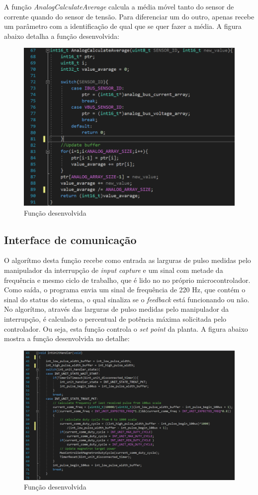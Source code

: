 A função \textit{AnalogCalculateAverage} calcula a média móvel tanto do sensor de corrente quando do sensor de tensão. Para diferenciar um do outro, apenas recebe um parâmetro com a identificação de qual que se quer fazer a média. A figura abaixo detalha a função desenvolvida:

\begin{figure}[H]
    \centering
    \includegraphics[width=1\textwidth]{./dados/figuras/func_average}
    \caption{Função desenvolvida}
    \label{fig:figura-magnetron-usado}
\end{figure}


\subsection{Interface de comunicação}
O algorítmo desta função recebe como entrada as larguras de pulso medidas pelo manipulador da interrupção de \textit{input capture} e um sinal com metade da frequência e mesmo ciclo de trabalho, que é lido no no próprio microcontrolador. Como saída, o programa envia um sinal de frequência de 220 Hz, que contém o sinal do status do sistema, o qual sinaliza se o \textit{feedback} está funcionando ou não. No algorítmo, através das larguras de pulso medidas pelo manipulador da interrupção, é calculado o percentual de potência máxima solicitada pelo controlador. Ou seja, esta função controla o \textit{set point} da planta. A figura abaixo mostra a função desenvolvida no detalhe:

\begin{figure}[H]
    \centering
    \includegraphics[width=1\textwidth]{./dados/figuras/func_comm}
    \caption{Função desenvolvida}
    \label{fig:figura-magnetron-usado}
\end{figure}